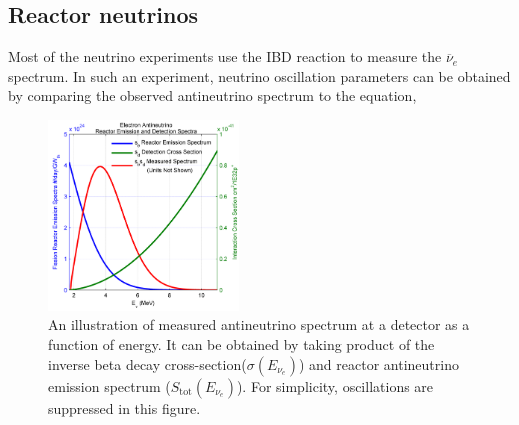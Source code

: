 \documentclass[11pt]{article}
\newcommand{\nuebar}{\ensuremath{\overline{\nu }_{e}} \hspace{1pt}}
\numberwithin{equation}{section}
\begin{document}
\subsection[Reactor neutrinos]{Reactor neutrinos}
Most of the neutrino experiments use the IBD reaction to measure the \nuebar spectrum. In such an experiment, neutrino oscillation parameters can be obtained by comparing the observed antineutrino spectrum to the equation,

\begin{figure}[h]
\centering
  \includegraphics[width=0.45\textwidth]{./spectrum.png}
\caption[Reactor antineutrino spectrum at detector]{An illustration of measured antineutrino spectrum at a detector as a function of energy. It can be obtained by taking product of  the inverse beta decay cross-section($\sigma (E_{\nu_{e}})$) and reactor antineutrino emission spectrum ($S_{\text{tot}}(E_{\nu_{e}})$). For simplicity, oscillations are suppressed in this figure\cite{Jocher2013131}.}
\label{fig:antinuSpectrum}
\end{figure}
\end{document}
